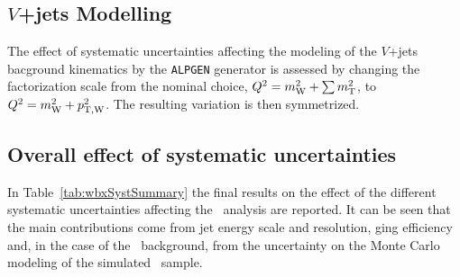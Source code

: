 \subsection{$V$+jets Modelling}

The effect of systematic uncertainties affecting the 
modeling of the $V$+jets bacground kinematics by the \texttt{ALPGEN}
generator is assessed by changing the factorization scale from the nominal
choice, $Q^2 =m_{\rm W}^2+\sum m_{\rm T}^2$, to $Q^2 =m_{\rm W}^2+p_{\rm T,W}^2$. 
The resulting variation is then symmetrized.



\subsection{Overall effect of systematic uncertainties}\label{sec:wbxALLSYS}

In Table~\ref{tab:wbxSystSummary} the final results on
the effect of the different systematic uncertainties affecting
the \wbx\ analysis are reported. It can be seen that the main
contributions come from jet energy scale and resolution,
\btag ging efficiency and, in the case of the \ttbar\ 
background, from the uncertainty on the Monte Carlo modeling
of the simulated \ttbar\ sample.

